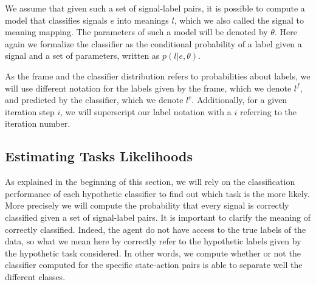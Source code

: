 We assume that given such a set of signal-label pairs, it is possible to compute a model that classifies signals $e$ into meanings $l$, which we also called the signal to meaning mapping. The parameters of such a model will be denoted by $\theta$. Here again we formalize the classifier as the conditional probability of a label given a signal and a set of parameters, written as $p(l|e,\theta)$.

As the frame and the classifier distribution refers to probabilities about labels, we will use different notation for the labels given by the frame, which we denote $l^f$, and predicted by the classifier, which we denote $l^c$.  Additionally, for a given iteration step $i$, we will superscript our label notation with a $i$ referring to the iteration number.


\subsection{Estimating Tasks Likelihoods}
\label{chapter:lfui:likelihood}

As explained in the beginning of this section, we will rely on the classification performance of each hypothetic classifier to find out which task is the more likely. More precisely we will compute the probability that every signal is correctly classified given a set of signal-label pairs. It is important to clarify the meaning of correctly classified. Indeed, the agent do not have access to the true labels of the data, so what we mean here by correctly refer to the hypothetic labels given by the hypothetic task considered. In other words, we compute whether or not the classifier computed for the specific state-action pairs is able to separate well the different classes. 

